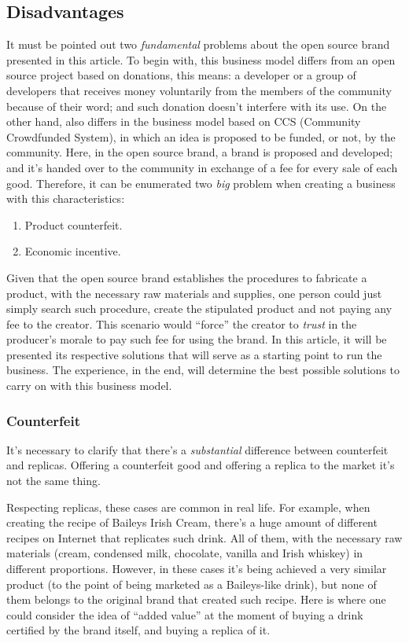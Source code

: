 \documentclass[12pt,a4paper]{article}
\begin{document}
\subsection{Disadvantages}
It must be pointed out two \textit{fundamental} problems about the open source brand presented in this article. To begin with, this business model differs from an open source project based on donations, this means: a developer or a group of developers that receives money voluntarily from the members of the community because of their word; and such donation doesn't interfere with its use. On the other hand, also differs in the business model based on CCS (Community Crowdfunded System), in which an idea is proposed to be funded, or not, by the community. Here, in the open source brand, a brand is proposed and developed; and it's handed over to the community in exchange of a fee for every sale of each good. Therefore, it can be enumerated two \textit{big} problem when creating a business with this characteristics:

\begin{enumerate}
\item Product counterfeit.
\item Economic incentive.
\end{enumerate}

Given that the open source brand establishes the procedures to fabricate a product, with the necessary raw materials and supplies, one person could just simply search such procedure, create the stipulated product and not paying any fee to the creator. This scenario would “force” the creator to \textit{trust} in the producer's morale to pay such fee for using the brand. In this article, it will be presented its respective solutions that will serve as a starting point to run the business. The experience, in the end, will determine the best possible solutions to carry on with this business model.

\subsubsection{Counterfeit}
It's necessary to clarify that there's a \textit{substantial} difference between counterfeit and replicas. Offering a counterfeit good and offering a replica to the market it's not the same thing.

Respecting replicas, these cases are common in real life. For example, when creating the recipe of Baileys Irish Cream, there's a huge amount of different recipes on Internet that replicates such drink. All of them, with the necessary raw materials (cream, condensed milk, chocolate, vanilla and Irish whiskey) in different proportions. However, in these cases it's being achieved a very similar product (to the point of being marketed as a Baileys-like drink), but none of them belongs to the original brand that created such recipe. Here is where one could consider the idea of “added value” at the moment of buying a  drink certified by the brand itself, and buying a replica of it.
\end{document}
